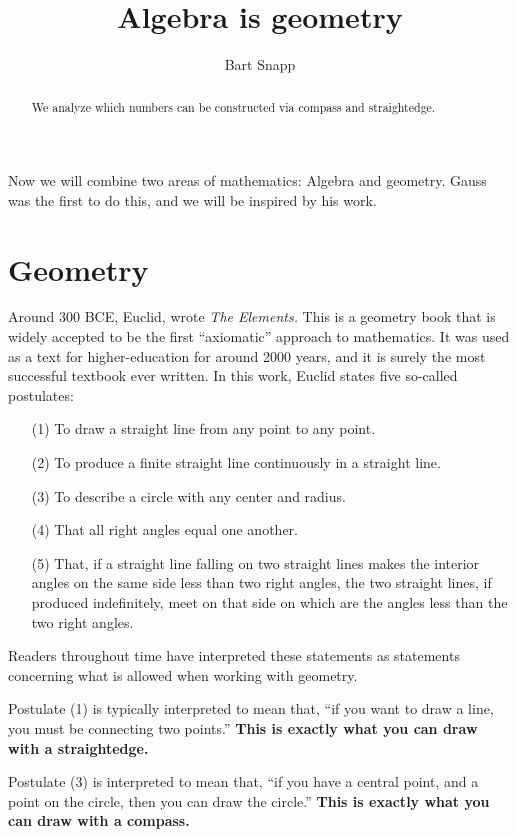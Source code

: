 \documentclass{ximera}
\author{Bart Snapp}
\title{Algebra is geometry}
\begin{document}
\begin{abstract}
  We analyze which numbers can be constructed via compass and
  straightedge.
\end{abstract}
\maketitle


Now we will combine two areas of mathematics: Algebra and
geometry. Gauss was the first to do this, and we will be inspired by
his work.

\section{Geometry}

Around 300 BCE, Euclid, wrote \textit{The Elements.} This is a
geometry book that is widely accepted to be the first ``axiomatic''
approach to mathematics. It was used as a text for higher-education
for around 2000 years, and it is surely the most successful textbook
ever written. In this work, Euclid states five so-called postulates:
\begin{enumerate}
\item[(1)] To draw a straight line from any point to any point.
\item[(2)] To produce a finite straight line continuously in a straight line.
\item[(3)] To describe a circle with any center and radius.
\item[(4)] That all right angles equal one another.
\item[(5)] That, if a straight line falling on two straight lines makes the
  interior angles on the same side less than two right angles, the two
  straight lines, if produced indefinitely, meet on that side on which
  are the angles less than the two right angles.
\end{enumerate}
Readers throughout time have interpreted these statements as statements
concerning what is allowed when working with geometry.

Postulate (1) is typically interpreted to mean that, ``if you want to
draw a line, you must be connecting two points.'' \textbf{This is
  exactly what you can draw with a straightedge.}


Postulate (3) is interpreted to mean that, ``if you have a central
point, and a point on the circle, then you can draw the circle.''
\textbf{This is exactly what you can draw with a compass.}
\end{document}
